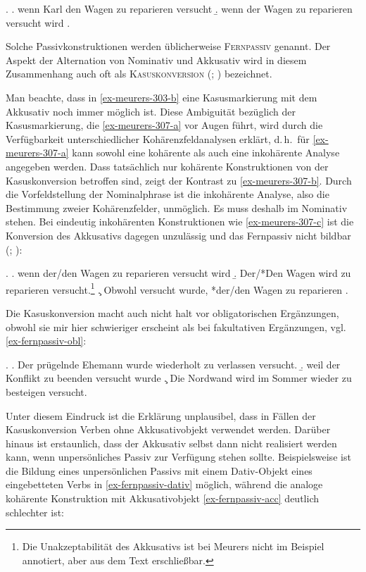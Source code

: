 \ex.
\a. wenn Karl den Wagen zu reparieren versucht \label{ex-meurers-303-a}
\b. wenn der Wagen zu reparieren versucht wird \label{ex-meurers-303-b}
\z. \citep[176]{Hoehle:78}

Solche Passivkonstruktionen werden üblicherweise \textsc{Fernpassiv} genannt. Der Aspekt der Alternation von Nominativ und Akkusativ wird in diesem Zusammenhang auch oft als \textsc{Kasuskonversion} (\citealt[Abschnitt~9.3]{Haider:93}; \citealt[Abschnitt~4.1]{Woellstein:01}) bezeichnet. 

Man beachte, dass in \ref{ex-meurers-303-b} eine Kasusmarkierung mit dem Akkusativ noch immer möglich ist. Diese Ambiguität bezüglich der Kasusmarkierung, die \ref{ex-meurers-307-a} vor Augen führt, wird durch die Verfügbarkeit unterschiedlicher Kohärenzfeldanalysen erklärt, d.\,h.\ für \ref{ex-meurers-307-a} kann sowohl eine kohärente als auch eine inkohärente Analyse angegeben werden. Dass tatsächlich nur kohärente Konstruktionen von der Kasuskonversion betroffen sind, zeigt der Kontrast zu \ref{ex-meurers-307-b}. Durch die Vorfeldstellung der Nominalphrase ist die inkohärente Analyse, also die Bestimmung zweier Kohärenzfelder, unmöglich. Es muss deshalb im Nominativ stehen. Bei eindeutig inkohärenten Konstruktionen wie \ref{ex-meurers-307-c} ist die Konversion des Akkusativs dagegen unzulässig und das Fernpassiv nicht bildbar (\citealt[136]{Kiss:95}; \citealt[304]{Meurers:99}):  

\ex. \label{ex-meurers-307}
\a. wenn der/den Wagen zu reparieren versucht wird \label{ex-meurers-307-a}
\b. Der/*Den Wagen wird zu reparieren versucht.\footnote{Die Unakzeptabilität des Akkusativs ist bei Meurers nicht im Beispiel annotiert, aber aus dem Text erschlie\ss bar.} \label{ex-meurers-307-b}
\c. Obwohl versucht wurde, *der/den Wagen zu reparieren \label{ex-meurers-307-c}
\z. \citep[(306,307)]{Meurers:99}

Die Kasuskonversion macht auch nicht halt vor obligatorischen Ergänzungen, obwohl sie mir hier schwieriger erscheint als bei fakultativen Ergänzungen, vgl. \ref{ex-fernpassiv-obl}: 

\ex. \label{ex-fernpassiv-obl}
\a. Der prügelnde Ehemann wurde wiederholt zu verlassen versucht.
\b. weil der Konflikt zu beenden versucht wurde \hfill \cite[(1a)]{Sabel:01}
\c. Die Nordwand wird im Sommer wieder zu besteigen versucht.

Unter diesem Eindruck ist die Erklärung unplausibel, dass in Fällen der Kasuskonversion Verben ohne Akkusativobjekt verwendet werden. Darüber hinaus ist erstaunlich, dass der Akkusativ selbst dann nicht realisiert werden kann, wenn unpersönliches Passiv zur Verfügung stehen sollte. Beispielsweise ist die Bildung eines unpersönlichen Passivs mit einem Dativ-Objekt eines eingebetteten Verbs in \ref{ex-fernpassiv-dativ} möglich, während die analoge kohärente Konstruktion mit Akkusativobjekt \ref{ex-fernpassiv-acc} deutlich schlechter ist:


